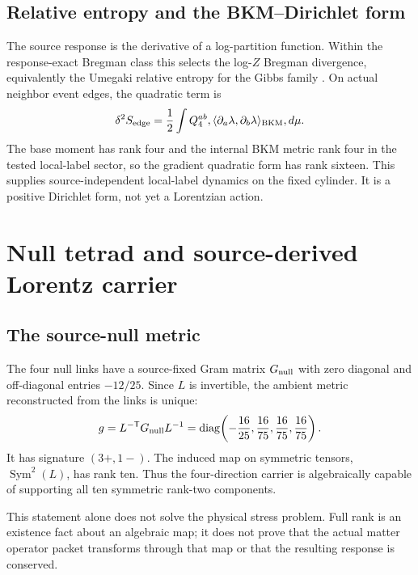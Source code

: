 \documentclass[11pt]{article}
\theoremstyle{definition}
\theoremstyle{remark}
\newcommand{\Sym}{\operatorname{Sym}}
\begin{document}
\subsection{Relative entropy and the BKM--Dirichlet form}

The source response is the derivative of a log-partition function. Within the response-exact Bregman class this selects the log-$Z$ Bregman divergence, equivalently the Umegaki relative entropy for the Gibbs family \cite{umegaki1962,amari2016}. On actual neighbor event edges, the quadratic term is
\begin{equation}\label{eq:bkm}
 \delta^2 S_{\rm edge}
 =\frac12\int Q_4^{ab},
 \langle \partial_a\lambda,\partial_b\lambda\rangle_{\rm BKM},d\mu.
\end{equation}
The base moment has rank four and the internal BKM metric rank four in the tested local-label sector, so the gradient quadratic form has rank sixteen. This supplies source-independent local-label dynamics on the fixed cylinder. It is a positive Dirichlet form, not yet a Lorentzian action.

\section{Null tetrad and source-derived Lorentz carrier}

\subsection{The source-null metric}

The four null links have a source-fixed Gram matrix $G_{\rm null}$ with zero diagonal and off-diagonal entries $-12/25$. Since $L$ is invertible, the ambient metric reconstructed from the links is unique:
\begin{equation}\label{eq:g-null}
 g=L^{-\mathsf T}G_{\rm null}L^{-1}
 =\operatorname{diag}\!\left(
 -\frac{16}{25},\frac{16}{75},\frac{16}{75},\frac{16}{75}
 \right).
\end{equation}
It has signature $(3+,1-)$. The induced map on symmetric tensors, $\Sym^2(L)$, has rank ten. Thus the four-direction carrier is algebraically capable of supporting all ten symmetric rank-two components.

This statement alone does not solve the physical stress problem. Full rank is an existence fact about an algebraic map; it does not prove that the actual matter operator packet transforms through that map or that the resulting response is conserved.
\end{document}
